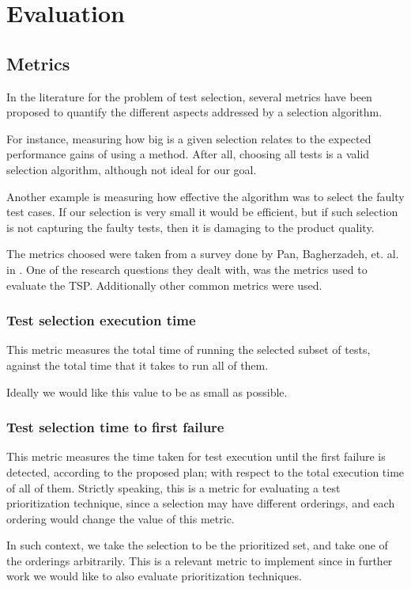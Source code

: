 \documentclass{article}
\begin{document}
\section{Evaluation}\label{section:evaluation}
\subsection{Metrics}
In the literature for the problem of test selection, several metrics have been proposed to quantify the different aspects addressed by a selection algorithm.

For instance, measuring how big is a given selection relates to the expected performance gains of using a method. After all, choosing all tests is a valid selection algorithm, although not ideal for our goal.

Another example is measuring how effective the algorithm was to select the faulty test cases. If our selection is very small it would be efficient, but if such selection is not capturing the faulty tests, then it is damaging to the product quality.

The metrics choosed were taken from a survey done by Pan, Bagherzadeh, et. al. in \cite{Pan2021TestCS}. One of the research questions they dealt with, was the metrics used to evaluate the TSP. Additionally other common metrics were used.
\subsubsection{Test selection execution time}
This metric measures the total time of running the selected subset of tests, against the total time that it takes to run all of them.

Ideally we would like this value to be as small as possible.
\subsubsection{Test selection time to first failure}\label{section:tffailure}
This metric measures the time taken for test execution until the first failure is detected, according to the proposed plan; with respect to the total execution time of all of them. Strictly speaking, this is a metric for evaluating a test prioritization technique, since a selection may have different orderings, and each ordering would change the value of this metric.

In such context, we take the selection to be the prioritized set, and take one of the orderings arbitrarily. This is a relevant metric to implement since in further work we would like to also evaluate prioritization techniques.
\end{document}
